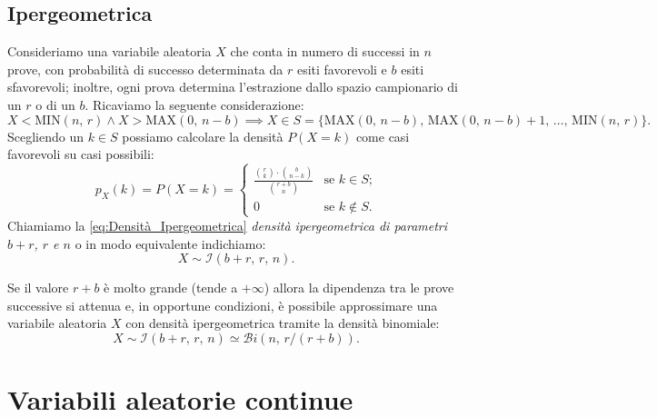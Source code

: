         \subsection{Ipergeometrica}
            \begin{defn}
                Consideriamo una variabile aleatoria $X$ che conta in numero di successi in $n$ prove, con probabilità di successo determinata da $r$ esiti favorevoli e $b$ esiti sfavorevoli; inoltre, ogni prova determina l'estrazione dallo spazio campionario di un $r$ o di un $b$.
                Ricaviamo la seguente considerazione: \[
                    X < \scriptstyle{\text{MIN}}(n,\,r) \land X > \scriptstyle{\text{MAX}}(0,\,n-b) \implies X \in S = \{\scriptstyle{\text{MAX}}(0,\,n-b),\, \scriptstyle{\text{MAX}}(0,\,n-b) + 1,\, \ldots,\, \scriptstyle{\text{MIN}}(n,\,r)\}
                .\] Scegliendo un $k \in S$ possiamo calcolare la densità $P(X = k)$ come casi favorevoli su casi possibili:
                \begin{equation}\label{eq:Densità_Ipergeometrica}
                    p_X(k) = P(X = k) = \begin{cases}
                        \frac{\binom{r}{k} \cdot \binom{b}{n-k}}{\binom{r+b}{n}} & \text{se $k \in S$;} \\
                        0 & \text{se $k \notin S$.}
                    \end{cases}
                \end{equation}
                Chiamiamo la \eqref{eq:Densità_Ipergeometrica} \textit{densità ipergeometrica di parametri $b+r$, $r$ e $n$} o in modo equivalente indichiamo: \[
                    X \sim \mathcal{I}(b+r,\, r,\, n)
                .\] 
            \end{defn}
            \begin{obsv}
                Se il valore $r+b$ è molto grande (tende a $+\infty$) allora la dipendenza tra le prove successive si attenua e, in opportune condizioni, è possibile approssimare una variabile aleatoria $X$ con densità ipergeometrica tramite la densità binomiale: \[
                    X \sim \mathcal{I}(b+r,\, r,\, n) \simeq \mathcal{B}i(n,\, r / (r+b))
                .\] 
            \end{obsv}
    \section{Variabili aleatorie continue}
        \begin{defn}
            
        \end{defn}
